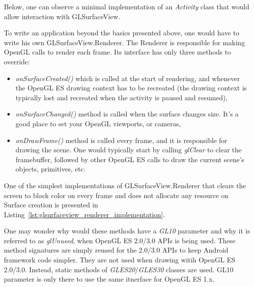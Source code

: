 Below, one can observe a minimal implementation of an \emph{Activity} class \cite{android_activity} that would allow interaction with GLSurfaceView.

%
\begin{filecode}[label=lst:opengl_es_activity,caption=Minimal implementation of Android's Activity class that would use GLSurfaceView.]
  
\end{filecode}

To write an application beyond the basics presented above, one would have to write his own GLSurfaceView.Renderer. The Renderer is responsible for making OpenGL calls to render each frame.
Its interface has only three methods to override:

\begin{itemize}
\item \emph{onSurfaceCreated()} which is called at the start of rendering, and whenever the OpenGL ES drawing context has to be recreated (the drawing context is typically lost and recreated when the activity is paused and resumed),
\item \emph{onSurfaceChanged()} method is called when the surface changes size. It's a good place to set your OpenGL viewports, or cameras,
\item \emph{onDrawFrame()} method is called every frame, and it is responsible for drawing the scene. One would typically start by calling \emph{glClear} to clear the framebuffer, followed by other OpenGL ES calls to draw the current scene's objects, primitives, etc.
\end{itemize}

\pagebreak[3]
One of the simplest implementations of GLSurfaceView.Renderer that clears the screen to black color on every frame and does not allocate any resource on Surface creation is presented in Listing~\ref{lst:glsurfaceview_renderer_implementation}.


\begin{note}
{One may wonder why would these methods have a \emph{GL10} parameter and why it is referred to as \emph{glUnused}, when OpenGL ES 2.0/3.0 APIs is being used.
These method signatures are simply reused for the 2.0/3.0 APIs to keep Android framework code simpler.
They are not used when drawing witih OpenGL ES 2.0/3.0.
Instead, static methods of \emph{GLES20}/\emph{GLES30} classes are used.
GL10 parameter is only there to use the same itnerface for OpenGL ES 1.x.
}
\end{note}

